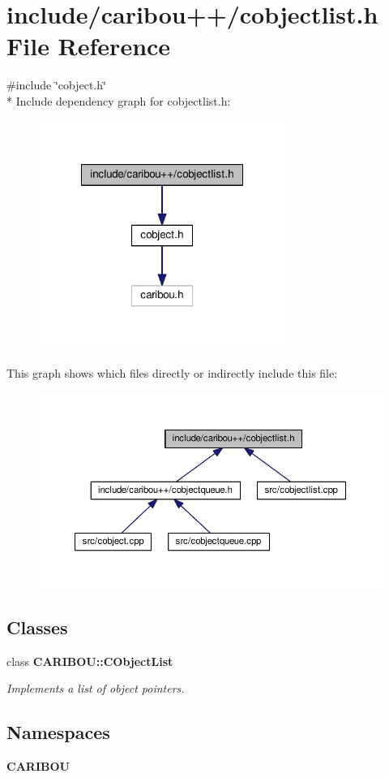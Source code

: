 \section{include/caribou++/cobjectlist.h File Reference}
\label{cobjectlist_8h}
{\ttfamily \#include \char`\"{}cobject.\-h\char`\"{}}\\*
Include dependency graph for cobjectlist.\-h\-:\nopagebreak
\begin{figure}[H]
\begin{center}
\leavevmode
\includegraphics[width=228pt]{cobjectlist_8h__incl}
\end{center}
\end{figure}
This graph shows which files directly or indirectly include this file\-:\nopagebreak
\begin{figure}[H]
\begin{center}
\leavevmode
\includegraphics[width=350pt]{cobjectlist_8h__dep__incl}
\end{center}
\end{figure}
\subsection*{Classes}
\begin{DoxyCompactItemize}
\item 
class {\bf C\-A\-R\-I\-B\-O\-U\-::\-C\-Object\-List}
\begin{DoxyCompactList}\small\item\em Implements a list of object pointers. \end{DoxyCompactList}\end{DoxyCompactItemize}
\subsection*{Namespaces}
\begin{DoxyCompactItemize}
\item 
{\bf C\-A\-R\-I\-B\-O\-U}
\end{DoxyCompactItemize}
